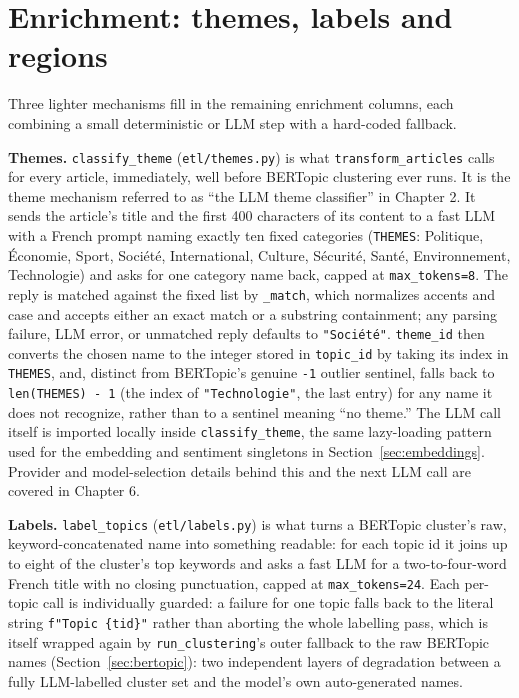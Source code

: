 \section{Enrichment: themes, labels and regions}
\label{sec:enrichment}
Three lighter mechanisms fill in the remaining enrichment columns, each combining a small deterministic or LLM step with a hard-coded fallback.

\textbf{Themes.} \texttt{classify\_theme} (\texttt{etl/\allowbreak themes.py}) is what \texttt{transform\_articles} calls for every article, immediately, well before BERTopic clustering ever runs. It is the theme mechanism referred to as ``the LLM theme classifier'' in Chapter 2. It sends the article's title and the first 400 characters of its content to a fast LLM with a French prompt naming exactly ten fixed categories (\texttt{THEMES}: Politique, Économie, Sport, Société, International, Culture, Sécurité, Santé, Environnement, Technologie) and asks for one category name back, capped at \texttt{max\_tokens=8}. The reply is matched against the fixed list by \texttt{\_match}, which normalizes accents and case and accepts either an exact match or a substring containment; any parsing failure, LLM error, or unmatched reply defaults to \texttt{"Société"}. \texttt{theme\_id} then converts the chosen name to the integer stored in \texttt{topic\_id} by taking its index in \texttt{THEMES}, and, distinct from BERTopic's genuine \texttt{-1} outlier sentinel, falls back to \texttt{len(THEMES) - 1} (the index of \texttt{"Technologie"}, the last entry) for any name it does not recognize, rather than to a sentinel meaning ``no theme.'' The LLM call itself is imported locally inside \texttt{classify\_theme}, the same lazy-loading pattern used for the embedding and sentiment singletons in Section~\ref{sec:embeddings}. Provider and model-selection details behind this and the next LLM call are covered in Chapter 6.

\begin{sloppypar}
\textbf{Labels.} \texttt{label\_topics} (\texttt{etl/\allowbreak labels.py}) is what turns a BERTopic cluster's raw, keyword-concatenated name into something readable: for each topic id it joins up to eight of the cluster's top keywords and asks a fast LLM for a two-to-four-word French title with no closing punctuation, capped at \texttt{max\_tokens=24}. Each per-topic call is individually guarded: a failure for one topic falls back to the literal string \texttt{f"Topic \{tid\}"} rather than aborting the whole labelling pass, which is itself wrapped again by \texttt{run\_clustering}'s outer fallback to the raw BERTopic names (Section~\ref{sec:bertopic}): two independent layers of degradation between a fully LLM-labelled cluster set and the model's own auto-generated names.
\end{sloppypar}

